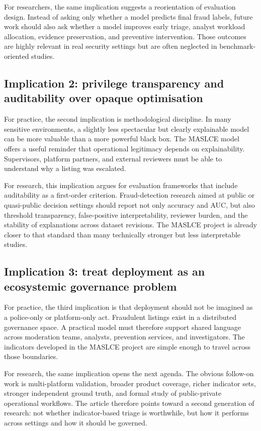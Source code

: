\documentclass[11pt,a4paper]{article}
\begin{document}
For researchers, the same implication suggests a reorientation of evaluation design. Instead of asking only whether a model predicts final fraud labels, future work should also ask whether a model improves early triage, analyst workload allocation, evidence preservation, and preventive intervention. Those outcomes are highly relevant in real security settings but are often neglected in benchmark-oriented studies.

\subsection{Implication 2: privilege transparency and auditability over opaque optimisation}
For practice, the second implication is methodological discipline. In many sensitive environments, a slightly less spectacular but clearly explainable model can be more valuable than a more powerful black box. The MASLCE model offers a useful reminder that operational legitimacy depends on explainability. Supervisors, platform partners, and external reviewers must be able to understand why a listing was escalated.

For research, this implication argues for evaluation frameworks that include auditability as a first-order criterion. Fraud-detection research aimed at public or quasi-public decision settings should report not only accuracy and AUC, but also threshold transparency, false-positive interpretability, reviewer burden, and the stability of explanations across dataset revisions. The MASLCE project is already closer to that standard than many technically stronger but less interpretable studies.

\subsection{Implication 3: treat deployment as an ecosystemic governance problem}
For practice, the third implication is that deployment should not be imagined as a police-only or platform-only act. Fraudulent listings exist in a distributed governance space. A practical model must therefore support shared language across moderation teams, analysts, prevention services, and investigators. The indicators developed in the MASLCE project are simple enough to travel across those boundaries.

For research, the same implication opens the next agenda. The obvious follow-on work is multi-platform validation, broader product coverage, richer indicator sets, stronger independent ground truth, and formal study of public-private operational workflows. The article therefore points toward a second generation of research: not whether indicator-based triage is worthwhile, but how it performs across settings and how it should be governed.
\end{document}
